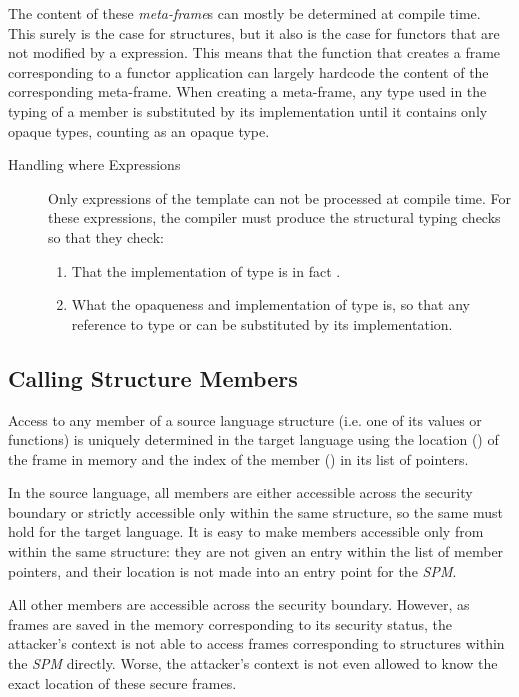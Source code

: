 The content of these \emph{meta-frame}s can mostly be determined at compile time. This surely is the case for structures, but it also is the case for functors that are not modified by a  expression.
This means that the function that creates a frame corresponding to a functor application can largely hardcode the content of the corresponding meta-frame.
When creating a meta-frame, any type used in the typing of a member is substituted by its implementation until it contains only opaque types, counting  as an opaque type.

\begin{description}
\item[Handling where Expressions] 
Only  expressions of the template  can not be processed at compile time.
For these expressions, the compiler must produce the structural typing checks so that they check:%
\begin{enumerate}
\item That the implementation of type  is in fact .
\item What the opaqueness and implementation of type  is, so that any reference to type  or  can be substituted by its implementation.
\end{enumerate}
\end{description}
\subsection{Calling Structure Members}
Access to any member of a source language structure (i.e. one of its values or functions) is uniquely determined in the target language using the location () of the frame in memory and the index of the member () in its list of pointers.

In the source language, all members are either accessible across the security boundary or strictly accessible only within the same structure, so the same must hold for the target language.
It is easy to make members accessible only from within the same structure: they are not given an entry within the list of member pointers, and their location is not made into an entry point for the \emph{SPM}.

All other members are accessible across the security boundary. However, as frames are saved in the memory corresponding to its security status, the attacker's context is not able to access frames corresponding to structures within the \emph{SPM} directly.
Worse, the attacker's context is not even allowed to know the exact location  of these secure frames.

